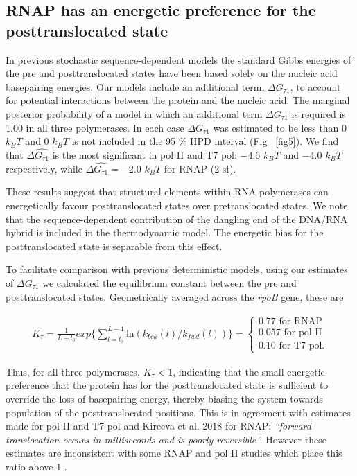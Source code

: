 \documentclass[10pt,letterpaper]{article}
\begin{document}
\subsection*{RNAP has an energetic preference for the posttranslocated state}
In previous stochastic sequence-dependent models \cite{bai2004sequence, tadigotla2006thermodynamic} the standard Gibbs energies of the pre and posttranslocated states have been based solely on the nucleic acid  basepairing energies. Our models include an additional term, $\Delta G_{\tau 1}$, to account for potential interactions between the protein and the nucleic acid. The marginal posterior probability of a model in which an additional term $\Delta G_{\tau 1}$ is required is 1.00 in all three polymerases. In each case $\Delta G_{\tau 1}$ was estimated to be less than 0 $k_BT$ and 0 $k_BT$ is not included in the 95 \% HPD interval (Fig ~\ref{fig5}). We find that $\Delta \hat{G_{\tau 1}}$ is the most significant in pol II and T7 pol: $-4.6$ $k_BT$  and $-4.0$ $k_BT$ respectively,  while $\Delta \hat{G_{\tau 1}} = -2.0$ $k_BT$ for RNAP (2 sf). \par

These results suggest that structural elements within RNA polymerases can energetically favour posttranslocated states over pretranslocated states. We note that the sequence-dependent contribution of the dangling end of the DNA/RNA hybrid is included in the thermodynamic model. The energetic bias for the posttranslocated state is separable from this effect.  \par

To facilitate comparison with previous deterministic models, using our estimates of $\Delta G_{\tau 1}$ we calculated the equilibrium constant between the pre and posttranslocated states. Geometrically averaged across the \textit{rpoB} gene, these are




\begin{eqnarray}
\bar{K}_\tau = \frac{1}{L - l_0} exp \{ \sum\limits_{l=l_0}^{L-1} \text{ln} (k_{bck}(l) / k_{fwd}(l)) \} = \begin{cases} 0.77 \text{ for RNAP} \\ 0.057 \text{ for pol II} \\ 0.10 \text{ for T7 pol.}  \end{cases}
\end{eqnarray}


Thus, for all three polymerases, $K_\tau < 1$, indicating that the small energetic preference that the protein has for the posttranslocated state is sufficient to override the loss of basepairing energy, thereby biasing the system towards population of the posttranslocated positions. This is in agreement with estimates made for pol II and T7 pol \cite{larson2012trigger, schweikhard2014transcription, thomen2008t7,yin2004structural, yu2012small} and Kireeva et al. 2018 \cite{kireeva2018rna} for RNAP: \textit{``forward translocation occurs in milliseconds and is poorly reversible''.} However these estimates are inconsistent with some RNAP and pol II studies which place this ratio above 1  \cite{abbondanzieri2005direct, kireeva2008transient, maoileidigh2011unified, Dangkulwanich2013complete}.
\end{document}
